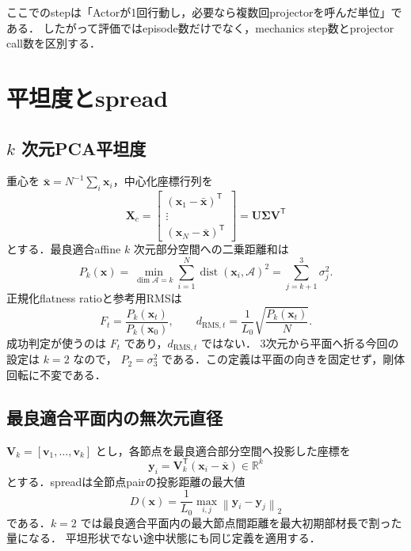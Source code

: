 \documentclass[a4paper,11pt]{ltjsarticle}
\newcommand{\R}{\mathbb{R}}
\newcommand{\norm}[1]{\left\lVert #1\right\rVert}
\begin{document}
ここでのstepは「Actorが1回行動し，必要なら複数回projectorを呼んだ単位」である．
したがって評価ではepisode数だけでなく，mechanics step数とprojector call数を区別する．

\section{平坦度とspread}

\subsection{\texorpdfstring{$k$}{k} 次元PCA平坦度}

重心を $\bar{\bm{x}}=N^{-1}\sum_i\bm{x}_i$，中心化座標行列を
\begin{equation}
  \bm{X}_c=
  \begin{bmatrix}
  (\bm{x}_1-\bar{\bm{x}})^\mathsf{T}\\[-1mm]
  \vdots\\[-1mm]
  (\bm{x}_N-\bar{\bm{x}})^\mathsf{T}
  \end{bmatrix}
  =\bm U\bm\Sigma\bm V^\mathsf T
\end{equation}
とする．最良適合affine $k$ 次元部分空間への二乗距離和は
\begin{equation}
  P_k(\bm{x})=\min_{\dim\mathcal A=k}
  \sum_{i=1}^N\operatorname{dist}(\bm{x}_i,\mathcal A)^2
  =\sum_{j=k+1}^{3}\sigma_j^2.
  \label{eq:flatness}
\end{equation}
正規化flatness ratioと参考用RMSは
\begin{equation}
  F_t=\frac{P_k(\bm{x}_t)}{P_k(\bm{x}_0)},\qquad
  d_{\mathrm{RMS},t}=\frac{1}{L_0}\sqrt{\frac{P_k(\bm{x}_t)}{N}}.
\end{equation}
成功判定が使うのは $F_t$ であり，$d_{\mathrm{RMS},t}$ ではない．
3次元から平面へ折る今回の設定は $k=2$ なので，
$P_2=\sigma_3^2$ である．この定義は平面の向きを固定せず，剛体回転に不変である．

\subsection{最良適合平面内の無次元直径}

$\bm V_k=[\bm v_1,\ldots,\bm v_k]$ とし，各節点を最良適合部分空間へ投影した座標を
\begin{equation}
  \bm{y}_i=\bm V_k^\mathsf T(\bm{x}_i-\bar{\bm{x}})\in\R^k
\end{equation}
とする．spreadは全節点pairの投影距離の最大値
\begin{equation}
  D(\bm{x})=\frac{1}{L_0}\max_{i,j}\norm{\bm{y}_i-\bm{y}_j}_2
  \label{eq:spread}
\end{equation}
である．$k=2$ では最良適合平面内の最大節点間距離を最大初期部材長で割った量になる．
平坦形状でない途中状態にも同じ定義を適用する．
\end{document}
